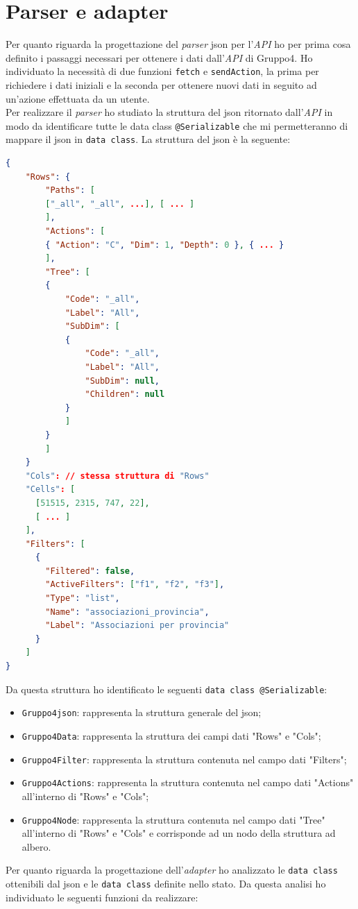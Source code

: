 \section{Parser e adapter}
Per quanto riguarda la progettazione del \emph{parser} json per l'\emph{API} ho per prima cosa definito i passaggi necessari per ottenere i dati dall'\emph{API} di Gruppo4. Ho individuato la necessità di due funzioni \verb|fetch| e \verb|sendAction|, la prima per richiedere i dati iniziali e la seconda per ottenere nuovi dati in seguito ad un'azione effettuata da un utente. \\
Per realizzare il \emph{parser} ho studiato la struttura del json ritornato dall'\emph{API} in modo da identificare tutte le data class \verb|@Serializable| che mi permetteranno di mappare il json in \verb|data class|. La struttura del json è la seguente:
\begin{lstlisting}[caption={Struttura JSON API}, label={lst:json_structure}, language=json]
{
	"Rows": {
		"Paths": [
		["_all", "_all", ...], [ ... ]
		],
		"Actions": [
		{ "Action": "C", "Dim": 1, "Depth": 0 }, { ... }
		],
		"Tree": [
		{
			"Code": "_all",
			"Label": "All",
			"SubDim": [
			{
				"Code": "_all",
				"Label": "All",
				"SubDim": null,
				"Children": null
			}
			]  
		}
		]
	}
	"Cols": // stessa struttura di "Rows"
	"Cells": [
	  [51515, 2315, 747, 22],
	  [ ... ]
	],
	"Filters": [
	  {
	    "Filtered": false,
	    "ActiveFilters": ["f1", "f2", "f3"],
	    "Type": "list",
	    "Name": "associazioni_provincia",
	    "Label": "Associazioni per provincia"
	  }
	]
}
\end{lstlisting}
Da questa struttura ho identificato le seguenti \verb|data class @Serializable|:
\begin{itemize}
	\item \verb|Gruppo4json|: rappresenta la struttura generale del json;
	\item \verb|Gruppo4Data|: rappresenta la struttura dei campi dati "Rows" e "Cols";
	\item \verb|Gruppo4Filter|: rappresenta la struttura contenuta nel campo dati "Filters";
	\item \verb|Gruppo4Actions|: rappresenta la struttura contenuta nel campo dati "Actions" all'interno di "Rows" e "Cols";
	\item \verb|Gruppo4Node|: rappresenta la struttura contenuta nel campo dati "Tree" all'interno di "Rows" e "Cols" e corrisponde ad un nodo della struttura ad albero.
\end{itemize}
\noindent
Per quanto riguarda la progettazione dell'\emph{adapter} ho analizzato le \verb|data class| ottenibili dal json e le \verb|data class| definite nello stato. Da questa analisi ho individuato le seguenti funzioni da realizzare:
